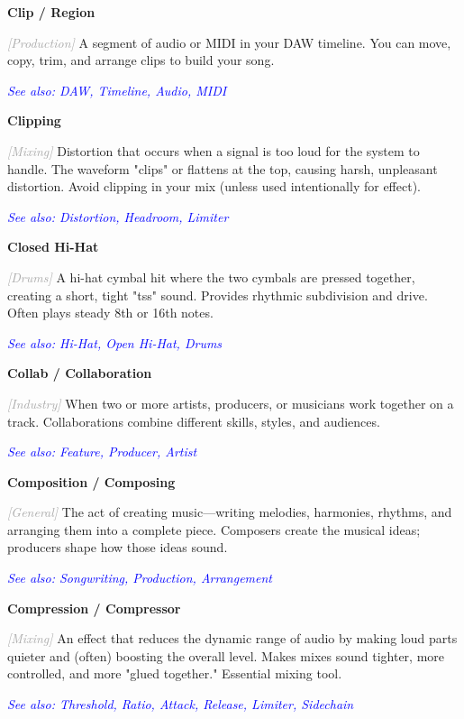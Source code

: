 \documentclass[11pt,letterpaper]{article}
\newcommand{\term}[1]{\textbf{\large\color{purple}#1}}
\newcommand{\category}[1]{\textcolor{darkgray}{\textit{\small [#1]}}}
\newcommand{\seealso}[1]{\textcolor{blue}{\textit{See also: #1}}}
\newenvironment{termdef}[1]
  {\noindent\term{#1}\par\nopagebreak}
  {\par\vspace{0.3em}}
\begin{document}
\begin{termdef}{Clip / Region}
\category{Production}
A segment of audio or MIDI in your DAW timeline. You can move, copy, trim, and arrange clips to build your song.

\seealso{DAW, Timeline, Audio, MIDI}
\end{termdef}

\begin{termdef}{Clipping}
\category{Mixing}
Distortion that occurs when a signal is too loud for the system to handle. The waveform "clips" or flattens at the top, causing harsh, unpleasant distortion. Avoid clipping in your mix (unless used intentionally for effect).

\seealso{Distortion, Headroom, Limiter}
\end{termdef}

\begin{termdef}{Closed Hi-Hat}
\category{Drums}
A hi-hat cymbal hit where the two cymbals are pressed together, creating a short, tight "tss" sound. Provides rhythmic subdivision and drive. Often plays steady 8th or 16th notes.

\seealso{Hi-Hat, Open Hi-Hat, Drums}
\end{termdef}

\begin{termdef}{Collab / Collaboration}
\category{Industry}
When two or more artists, producers, or musicians work together on a track. Collaborations combine different skills, styles, and audiences.

\seealso{Feature, Producer, Artist}
\end{termdef}

\begin{termdef}{Composition / Composing}
\category{General}
The act of creating music—writing melodies, harmonies, rhythms, and arranging them into a complete piece. Composers create the musical ideas; producers shape how those ideas sound.

\seealso{Songwriting, Production, Arrangement}
\end{termdef}

\begin{termdef}{Compression / Compressor}
\category{Mixing}
An effect that reduces the dynamic range of audio by making loud parts quieter and (often) boosting the overall level. Makes mixes sound tighter, more controlled, and more "glued together." Essential mixing tool.

\seealso{Threshold, Ratio, Attack, Release, Limiter, Sidechain}
\end{termdef}
\end{document}
